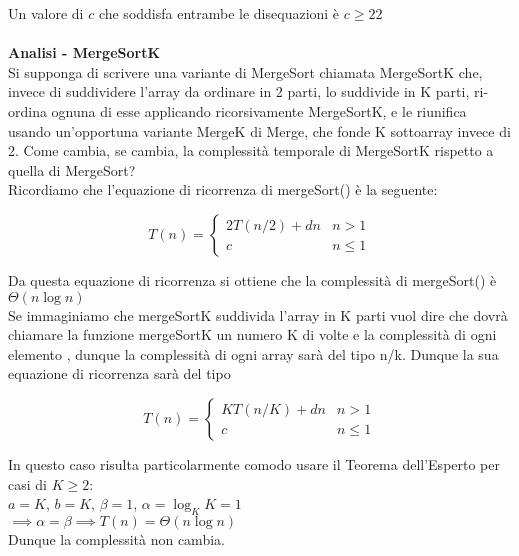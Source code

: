 \documentclass[../cheatSheetAlgoritmi.tex]{subfiles}
\begin{document}
Un valore di $c$ che soddisfa entrambe le disequazioni è $c \geq 22$\\\\
\textbf{Analisi - MergeSortK}\\
Si supponga di scrivere una variante di MergeSort chiamata MergeSortK che, invece di suddividere l’array da ordinare in 2 parti, lo suddivide in K parti, ri-ordina ognuna di esse applicando ricorsivamente MergeSortK, e le riunifica usando un’opportuna variante MergeK di Merge, che fonde K sottoarray invece di 2. Come cambia, se cambia, la complessità temporale di MergeSortK rispetto a quella di MergeSort?\\
Ricordiamo che l'equazione di ricorrenza di mergeSort() è la seguente:
\begin{center}
	\begin{equation*}
  		T(n)=\begin{cases}
			2T(n/2) +  dn & \text{$n > 1$}\\
			c & \text{$n \leq 1$}	
  		\end{cases}
	\end{equation*}
\end{center}
Da questa equazione di ricorrenza si ottiene che la complessità di mergeSort() è $\Theta(n\log{n})$\\
Se immaginiamo che mergeSortK suddivida l'array in K parti vuol dire che dovrà chiamare la funzione mergeSortK un numero K di volte e la complessità di ogni elemento , dunque la complessità di ogni array sarà del tipo n/k. Dunque la sua equazione di ricorrenza sarà del tipo
\begin{center}
	\begin{equation*}
  		T(n)=\begin{cases}
			KT(n/K) +  dn & \text{$n > 1$}\\
			c & \text{$n \leq 1$}	
  		\end{cases}
	\end{equation*}
\end{center}
In questo caso risulta particolarmente comodo usare il Teorema dell'Esperto per casi di $K \geq 2$:\\
$a = K$, $b = K$, $\beta = 1$, $\alpha = \log_{K}{K} = 1$\\
$\implies \alpha = \beta \implies T(n) = \Theta(n\log{n})$\\
Dunque la complessità non cambia.

\newpage
\end{document}
